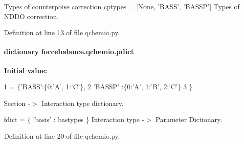 Types of counterpoise correction cptypes = \mbox{[}None, 'B\-A\-S\-S', 'B\-A\-S\-S\-P'\mbox{]} Types of N\-D\-D\-O correction. 



Definition at line 13 of file qchemio.\-py.

\hypertarget{namespaceforcebalance_1_1qchemio_ad9040be76e063b08b49a26ca12295a18}{
\paragraph[{pdict}]{\setlength{\rightskip}{0pt plus 5cm}dictionary forcebalance.\-qchemio.\-pdict}}\label{namespaceforcebalance_1_1qchemio_ad9040be76e063b08b49a26ca12295a18}
{\bfseries Initial value\-:}
\begin{DoxyCode}
1 = \{\textcolor{stringliteral}{'BASS'}:\{0:\textcolor{stringliteral}{'A'}, 1:\textcolor{stringliteral}{'C'}\},
2          \textcolor{stringliteral}{'BASSP'} :\{0:\textcolor{stringliteral}{'A'}, 1:\textcolor{stringliteral}{'B'}, 2:\textcolor{stringliteral}{'C'}\}
3          \}
\end{DoxyCode}


Section -\/$>$ Interaction type dictionary. 

fdict = \{ 'basis' \-: bastypes \} Interaction type -\/$>$ Parameter Dictionary. 

Definition at line 20 of file qchemio.\-py.


